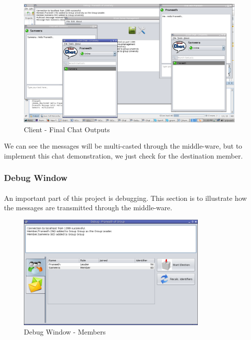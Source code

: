 \documentclass[a4paper,english,twoside]{article}
\begin{document}
\begin{figure}[h]
\begin{center}
\includegraphics[width=430px]{Client-Chat.png}
\caption{Client - Final Chat Outputs}
\end{center}
\end{figure}

We can see the messages will be multi-casted through the middle-ware, but to implement this chat demonstration, we just check for the destination member.

\newpage
\subsubsection{Debug Window}
\paragraph{}
An important part of this project is debugging. This section is to illustrate how the messages are transmitted through the middle-ware.

\begin{figure}[h]
\begin{center}
\includegraphics[width=350px]{DebugWindow-1.png}
\caption{Debug Window - Members}
\end{center}
\end{figure}
\end{document}
